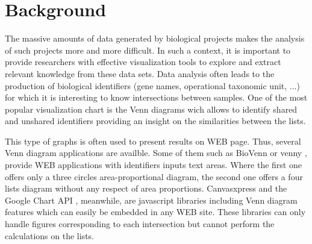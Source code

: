 \documentclass{bmcart}
\begin{document}



\section*{Background}

The massive amounts of data generated by biological projects makes the analysis of such projects more and 
more difficult. In such a context, it is important to provide researchers with effective visualization 
tools to explore and extract relevant knowledge from these data sets. Data analysis often leads to the 
production of biological identifiers (gene names, operational taxonomic unit, ...) for which it is 
interesting to know intersections between samples. One of the most popular visualization chart is the 
Venn diagrams \cite{Venn1880} wich allows to identify shared and unshared identifiers providing an insight 
on the similarities between the lists.

This type of graphs is often used to present results on WEB page. Thus, several Venn diagram applications are 
availble. Some of them such as BioVenn \cite{Hulsen2008} or venny \cite{venny}, provide WEB 
applications with identifiers inputs text areas. Where the first one offers only a three circles 
area-proportional diagram, the second one offers a four lists diagram without any respect of area proportions. 
Canvasxpress \cite{canvasxpress} and the Google Chart API \cite{googleAPI}, meanwhile, are javascript libraries 
including Venn diagram features which can easily be embedded in any WEB site. These libraries can only handle 
figures corresponding to each intersection but cannot perform the calculations on the lists.
\end{document}
